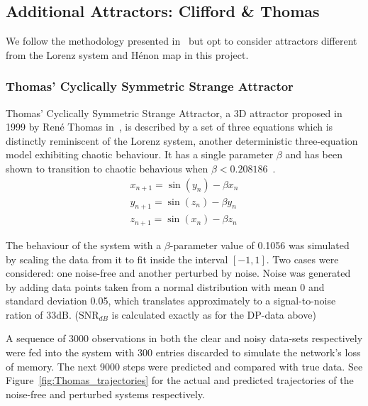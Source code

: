  

\subsection{Additional Attractors: Clifford \& Thomas}
We follow the methodology presented in~\cite{manjunath2021universal} but opt to consider attractors different from the Lorenz system and H\'enon map in this project.

\subsubsection{Thomas' Cyclically Symmetric Strange Attractor}\label{Thomas_Attractor}
Thomas' Cyclically Symmetric Strange Attractor, a 3D attractor proposed in 1999 by Ren\'e Thomas in~\cite{ThomasAttractor}, is described by a set of three equations which is distinctly reminiscent of the Lorenz system, another deterministic three-equation model exhibiting chaotic behaviour. It has a single parameter $\beta$ and has been shown to transition to chaotic behavious when $\beta<0.208186$~\cite{Thomas_BetaParameter}.
\begin{eqnarray}\label{eqns_thomas}
  x_{n+1} = \sin(y_n) - \beta{x_n} \\
  y_{n+1} = \sin(z_n) - \beta{y_n} \\
  z_{n+1} = \sin(x_n) - \beta{z_n}
\end{eqnarray}

The behaviour of the system with a $\beta$-parameter value of 0.1056 was simulated by scaling the data from it to fit inside the interval $[-1,1]$. Two cases were considered: one noise-free and another perturbed by noise. 
Noise was generated  by adding data points taken from a normal distribution with mean 0 and standard deviation 0.05, which translates approximately to a signal-to-noise ration of 33dB. 
($\text{SNR}_{dB}$ is calculated exactly as for the DP-data above)

A sequence of 3000 observations in both the clear and noisy data-sets respectively were fed into the system with 300 entries discarded to simulate the network's loss of memory. 
The next 9000 steps were predicted and compared with true data. See Figure~\ref{fig:Thomas_trajectories} for the actual and predicted trajectories of the noise-free and perturbed systems respectively. 

